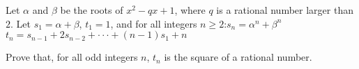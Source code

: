 Let $\alpha$ and $\beta$ be the roots of $x^{2} - qx + 1$,  where $q$ is a rational number larger than $2$. Let $s_1 = \alpha + \beta$,  $t_1 = 1$,  and for all integers $n \geq 2$:$s_n = \alpha^n + \beta^n$$t_n = s_{n-1} + 2s_{n-2} + \cdot \cdot \cdot + (n - 1)s_{1} + n$

Prove that, for all odd integers $n$,  $t_n$ is the square of a rational number.
